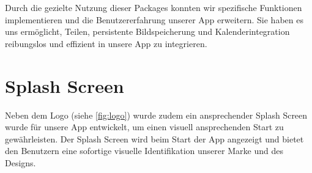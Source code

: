 Durch die gezielte Nutzung dieser Packages konnten wir spezifische Funktionen implementieren und die Benutzererfahrung unserer App erweitern. Sie haben es uns ermöglicht, Teilen, persistente Bildspeicherung und Kalenderintegration reibungslos und effizient in unsere App zu integrieren.

\section{Splash Screen}
Neben dem Logo (siehe \ref{fig:logo}) wurde zudem ein ansprechender Splash Screen wurde für unsere App entwickelt, um einen visuell ansprechenden Start zu gewährleisten. Der Splash Screen wird beim Start der App angezeigt und bietet den Benutzern eine sofortige visuelle Identifikation unserer Marke und des Designs.